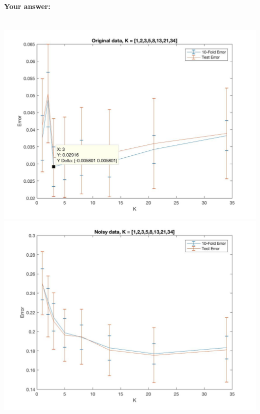 \documentclass[english]{article}
\begin{document}
\begin{itemize}
\paragraph{Your answer:}
 ~\\
 
 {\tt  \includegraphics[width=1\textwidth]{original_KNN_part2.jpg}}
 \\    
 
 {\tt \includegraphics[width=1\textwidth]{noisy_KNN_part2.jpg}}
 \\


\end{itemize}
\end{document}
